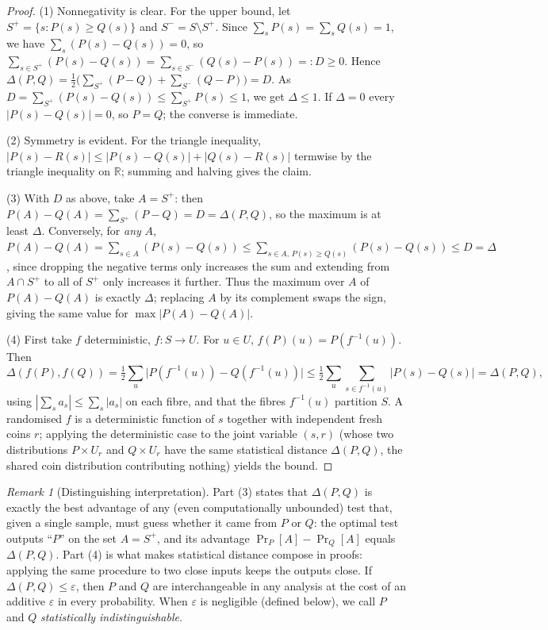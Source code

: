 \documentclass[11pt,a4paper]{article}
\theoremstyle{definition}
\theoremstyle{remark}
\newtheorem{remark}[theorem]{Remark}
\newcommand{\R}{\ensuremath{\mathbb{R}}}
\begin{document}
\begin{proof}
(1) Nonnegativity is clear. For the upper bound, let \(S^+ = \{s : P(s) \ge Q(s)\}\) and \(S^- = S \setminus S^+\). Since \(\sum_s P(s) = \sum_s Q(s) = 1\), we have \(\sum_{s}(P(s)-Q(s)) = 0\), so \(\sum_{s \in S^+}(P(s)-Q(s)) = \sum_{s \in S^-}(Q(s)-P(s)) =: D \ge 0\). Hence \(\Delta(P,Q) = \tfrac12\big(\sum_{S^+}(P-Q) + \sum_{S^-}(Q-P)\big) = D\). As \(D = \sum_{S^+}(P(s) - Q(s)) \le \sum_{S^+}P(s) \le 1\), we get \(\Delta \le 1\). If \(\Delta = 0\) every \(|P(s)-Q(s)| = 0\), so \(P=Q\); the converse is immediate.

(2) Symmetry is evident. For the triangle inequality, \(|P(s)-R(s)| \le |P(s)-Q(s)| + |Q(s)-R(s)|\) termwise by the triangle inequality on \(\R\); summing and halving gives the claim.

(3) With \(D\) as above, take \(A = S^+\): then \(P(A) - Q(A) = \sum_{S^+}(P-Q) = D = \Delta(P,Q)\), so the maximum is at least \(\Delta\). Conversely, for \emph{any} \(A\), \(P(A)-Q(A) = \sum_{s\in A}(P(s)-Q(s)) \le \sum_{s\in A,\, P(s)\ge Q(s)}(P(s)-Q(s)) \le D = \Delta\), since dropping the negative terms only increases the sum and extending from \(A\cap S^+\) to all of \(S^+\) only increases it further. Thus the maximum over \(A\) of \(P(A)-Q(A)\) is exactly \(\Delta\); replacing \(A\) by its complement swaps the sign, giving the same value for \(\max|P(A)-Q(A)|\).

(4) First take \(f\) deterministic, \(f\colon S \to U\). For \(u \in U\), \(f(P)(u) = P(f^{-1}(u))\). Then
\[
\Delta(f(P), f(Q)) = \tfrac12\sum_{u}\big|P(f^{-1}(u)) - Q(f^{-1}(u))\big| \le \tfrac12 \sum_u \sum_{s \in f^{-1}(u)} |P(s)-Q(s)| = \Delta(P,Q),
\]
using \(|\sum_s a_s| \le \sum_s |a_s|\) on each fibre, and that the fibres \(f^{-1}(u)\) partition \(S\). A randomised \(f\) is a deterministic function of \(s\) together with independent fresh coins \(r\); applying the deterministic case to the joint variable \((s, r)\) (whose two distributions \(P \times U_r\) and \(Q \times U_r\) have the same statistical distance \(\Delta(P,Q)\), the shared coin distribution contributing nothing) yields the bound.
\end{proof}

\begin{remark}[Distinguishing interpretation]\label{probability:rem-sd}
Part (3) states that \(\Delta(P,Q)\) is exactly the best advantage of any (even computationally unbounded) test that, given a single sample, must guess whether it came from \(P\) or \(Q\): the optimal test outputs ``\(P\)'' on the set \(A = S^+\), and its advantage \(\Pr_{P}[A] - \Pr_Q[A]\) equals \(\Delta(P,Q)\). Part (4) is what makes statistical distance compose in proofs: applying the same procedure to two close inputs keeps the outputs close. If \(\Delta(P,Q) \le \varepsilon\), then \(P\) and \(Q\) are interchangeable in any analysis at the cost of an additive \(\varepsilon\) in every probability. When \(\varepsilon\) is negligible (defined below), we call \(P\) and \(Q\) \emph{statistically indistinguishable}.
\end{remark}
\end{document}
